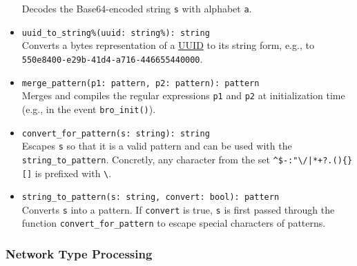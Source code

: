 \documentclass[10pt,landscape]{article}
\begin{document}
\begin{multicols*}{2}
\begin{itemize}
    Decodes the Base64-encoded string \verb|s| with alphabet \verb|a|.
  \item \verb|uuid_to_string%(uuid: string%): string|\\
    Converts a bytes representation of a
    \href{http://en.wikipedia.org/wiki/Universally_unique_identifier}{UUID} to
    its string form, e.g., to \verb|550e8400-e29b-41d4-a716-446655440000|.
  \item \verb|merge_pattern(p1: pattern, p2: pattern): pattern|\\
    Merges and compiles the regular expressions \verb|p1| and \verb|p2| at
    initialization time (e.g., in the event \verb|bro_init()|).
  \item \verb|convert_for_pattern(s: string): string|\\
    Escapes \verb|s| so that it is a valid pattern and can be used with the
    \verb|string_to_pattern|. Concretly, any character
    from the set \verb#^$-:"\/|*+?.(){}[]# is prefixed with \verb|\|.
  \item \verb|string_to_pattern(s: string, convert: bool): pattern|\\
    Converts \verb|s| into a pattern. If \verb|convert| is true, \verb|s| is
    first passed through the function \verb|convert_for_pattern| to escape
    special characters of patterns.
\end{itemize}

\subsubsection*{Network Type Processing}


\end{multicols*}
\end{document}
